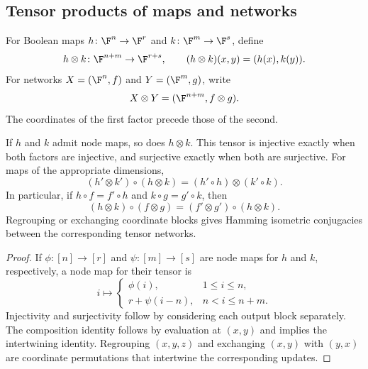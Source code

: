 \subsection{Tensor products of maps and networks}\label{subsec:node-map-tensor}

\begin{definition}\label{def:network-tensor}
For Boolean maps $h\colon\F^n\to\F^r$ and $k\colon\F^m\to\F^s$, define
\[
    h\otimes k\colon\F^{n+m}\to\F^{r+s},
    \qquad (h\otimes k)(x,y)=(h(x),k(y)).
\]
For networks $X=(\F^n,f)$ and $Y=(\F^m,g)$, write
\[
    X\otimes Y=(\F^{n+m},f\otimes g).
\]
The coordinates of the first factor precede those of the second.
\end{definition}

\begin{proposition}\label{prop:node-map-tensor}
If $h$ and $k$ admit node maps, so does $h\otimes k$. This tensor is injective exactly when both factors are injective, and surjective exactly when both are surjective. For maps of the appropriate dimensions,
\[
    (h'\otimes k')\circ(h\otimes k)
    =(h'\circ h)\otimes(k'\circ k).
\]
In particular, if $h\circ f=f'\circ h$ and $k\circ g=g'\circ k$, then
\[
    (h\otimes k)\circ(f\otimes g)
    =(f'\otimes g')\circ(h\otimes k).
\]
Regrouping or exchanging coordinate blocks gives Hamming isometric conjugacies between the corresponding tensor networks.
\end{proposition}

\begin{proof}
If $\phi\colon[n]\to[r]$ and $\psi\colon[m]\to[s]$ are node maps for $h$ and $k$, respectively, a node map for their tensor is
\[
    i\longmapsto
    \begin{cases}
        \phi(i),&1\leq i\leq n,\\
        r+\psi(i-n),&n<i\leq n+m.
    \end{cases}
\]
Injectivity and surjectivity follow by considering each output block separately. The composition identity follows by evaluation at $(x,y)$ and implies the intertwining identity. Regrouping $(x,y,z)$ and exchanging $(x,y)$ with $(y,x)$ are coordinate permutations that intertwine the corresponding updates.
\end{proof}

